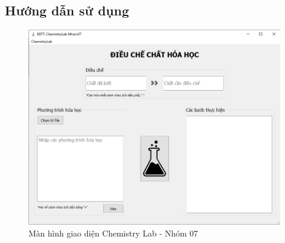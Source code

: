 \documentclass[a4paper]{article}
\begin{document}
	\subsection{Hướng dẫn sử dụng}
		\begin{figure}[h]
			\centering
			\includegraphics[width=0.7\linewidth]{images/app-ui}
			\caption{Màn hình giao diện Chemistry Lab - Nhóm 07}
			\label{fig:app-ui}
		\end{figure}
\end{document}
